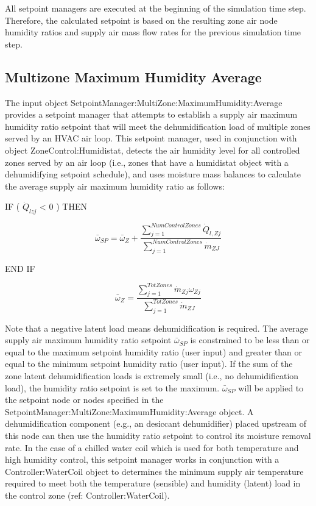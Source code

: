 All setpoint managers are executed at the beginning of the simulation time step. Therefore, the calculated setpoint is based on the resulting zone air node humidity ratios and supply air mass flow rates for the previous simulation time step.

\subsection{Multizone Maximum Humidity Average}\label{multizone-maximum-humidity-average}

The input object SetpointManager:MultiZone:MaximumHumidity:Average provides a setpoint manager that attempts to establish a supply air maximum humidity ratio setpoint that will meet the dehumidification load of multiple zones served by an HVAC air loop. This setpoint manager, used in conjunction with object ZoneControl:Humidistat, detects the air humidity level for all controlled zones served by an air loop (i.e., zones that have a humidistat object with a dehumidifying setpoint schedule), and uses moisture mass balances to calculate the average supply air maximum humidity ratio as follows:

IF ( \({\dot Q_{lzj}}\) \textless{} 0 ) THEN

\begin{equation}
  \bar{\omega}_{SP} = \bar{\omega}_Z + \frac{\sum\limits_{j = 1}^{NumControlZones}\dot{Q}_{l,Zj}}{\sum\limits_{j = 1}^{NumControlZones}\dot{m}_{ZJ}}
\end{equation}

END IF

\begin{equation}
  \bar{\omega}_{Z} = \frac{\sum\limits_{j = 1}^{TotZones}\dot{m}_{Zj}\omega_{Zj}}{\sum\limits_{j = 1}^{TotZones}\dot{m}_{ZJ}}
\end{equation}

Note that a negative latent load means dehumidification is required. The average supply air maximum humidity ratio setpoint \({\bar \omega_{SP}}\) is constrained to be less than or equal to the maximum setpoint humidity ratio (user input) and greater than or equal to the minimum setpoint humidity ratio (user input). If the sum of the zone latent dehumidification loads is extremely small (i.e., no dehumidification load), the humidity ratio setpoint is set to the maximum. \({\bar \omega_{SP}}\) will be applied to the setpoint node or nodes specified in the SetpointManager:MultiZone:MaximumHumidity:Average object. A dehumidification component (e.g., an desiccant dehumidifier) placed upstream of this node can then use the humidity ratio setpoint to control its moisture removal rate. In the case of a chilled water coil which is used for both temperature and high humidity control, this setpoint manager works in conjunction with a Controller:WaterCoil object to determines the minimum supply air temperature required to meet both the temperature (sensible) and humidity (latent) load in the control zone (ref: Controller:WaterCoil).

